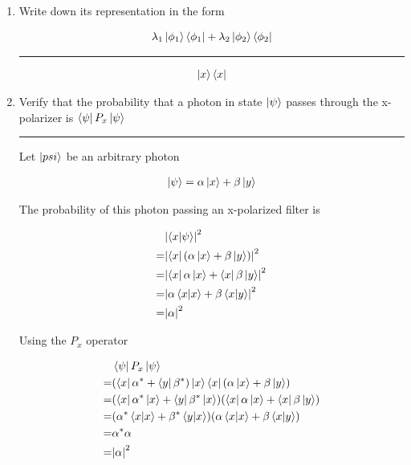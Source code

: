 \documentclass[12pt, oneside]{article}
\newenvironment{answer}
  {\vspace*{0.2cm} \rule{12cm}{0.02cm} \vspace*{0.2cm}}
  {\vspace*{0.2cm}}
\begin{document}
\begin{enumerate}
\begin{enumerate}
\begin{answer}
    \end{answer}

    \item Write down its representation in the form

    \begin{align*}
      \lambda_1\ket{\phi_1}\bra{\phi_1} + \lambda_2\ket{\phi_2}\bra{\phi_2}
    \end{align*}

    \begin{answer}
      \begin{align*}
        \ket{x}\bra{x}
      \end{align*}
    \end{answer}

    \item Verify that the probability that a photon in state $\ket{\psi}$ passes through the x-polarizer is $\bra{\psi}P_x\ket{\psi}$

    \begin{answer}
      Let $\ket{psi}$ be an arbitrary photon

      \begin{align*}
        \ket{\psi} = \alpha\ket{x} + \beta\ket{y}
      \end{align*}

      The probability of this photon passing an x-polarized filter is

      \begin{align*}
          &\abs{\bra{x}\ket{\psi}}^2\\
        = &\abs{\bra{x}(\alpha\ket{x} + \beta\ket{y})}^2\\
        = &\abs{\bra{x}\alpha\ket{x} + \bra{x}\beta\ket{y}}^2\\
        = &\abs{\alpha\bra{x}\ket{x} + \beta\bra{x}\ket{y}}^2\\
        = &\abs{\alpha}^2
      \end{align*}

      Using the $P_x$ operator

      \begin{align*}
          &\bra{\psi}P_x\ket{\psi}\\
        = &(\bra{x}\alpha^* + \bra{y}\beta^*)\ket{x}\bra{x}(\alpha\ket{x} + \beta\ket{y})\\
        = &(\bra{x}\alpha^*\ket{x} + \bra{y}\beta^*\ket{x})(\bra{x}\alpha\ket{x} + \bra{x}\beta\ket{y})\\
        = &(\alpha^*\bra{x}\ket{x} + \beta^*\bra{y}\ket{x})(\alpha\bra{x}\ket{x} + \beta\bra{x}\ket{y})\\
        = &\alpha^*\alpha\\
        = &\abs{\alpha}^2
      \end{align*}
    \end{answer}
  \end{enumerate}


\end{enumerate}
\end{document}

